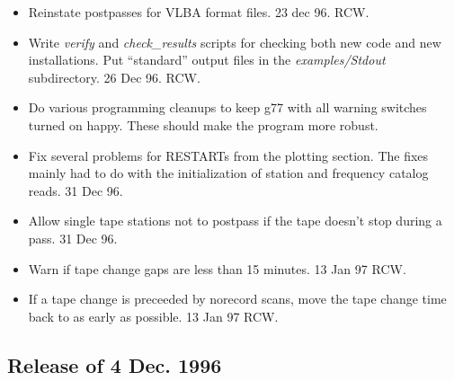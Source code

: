 \documentclass{report}
\begin{document}
\begin{itemize}
\item Reinstate postpasses for VLBA format files.  23 dec 96.  RCW.

\item Write {\sl verify} and {\sl check\_results} scripts for checking
      both new code and new installations.  Put ``standard'' output
      files in the {\sl examples/Stdout} subdirectory.  26 Dec 96. RCW.

\item Do various programming cleanups to keep g77 with all warning
      switches turned on happy.  These should make the program more
      robust.

\item Fix several problems for RESTARTs from the plotting section.
      The fixes mainly had to do with the initialization of station
      and frequency catalog reads.  31 Dec 96.

\item Allow single tape stations not to postpass if the tape doesn't
      stop during a pass.  31 Dec 96.

\item Warn if tape change gaps are less than 15 minutes.  13 Jan 97 RCW.

\item If a tape change is preceeded by norecord scans, move the tape
      change time back to as early as possible.  13 Jan 97 RCW.

\end{itemize}

\subsection{\label{SSSEC:DEC96}Release of 4 Dec. 1996}
\end{document}
